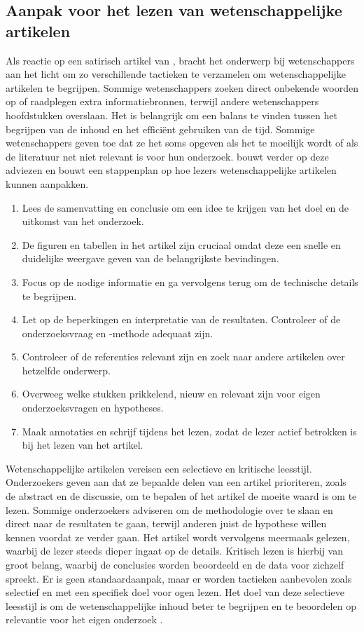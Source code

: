 \subsection{Aanpak voor het lezen van wetenschappelijke artikelen}
Als reactie op een satirisch artikel van \textcite{Ruben2016}, bracht \textcite{Pain2016} het onderwerp bij wetenschappers aan het licht om zo verschillende tactieken te verzamelen om wetenschappelijke artikelen te begrijpen. Sommige wetenschappers zoeken direct onbekende woorden op of raadplegen extra informatiebronnen, terwijl andere wetenschappers hoofdstukken overslaan. Het is belangrijk om een balans te vinden tussen het begrijpen van de inhoud en het efficiënt gebruiken van de tijd. Sommige wetenschappers geven toe dat ze het soms opgeven als het te moeilijk wordt of als de literatuur net niet relevant is voor hun onderzoek. \textcite{Pain2016} bouwt verder op deze adviezen en bouwt een stappenplan op hoe lezers wetenschappelijke artikelen kunnen aanpakken.

\begin{enumerate}
	\item Lees de samenvatting en conclusie om een idee te krijgen van het doel en de uitkomst van het onderzoek.
	\item De figuren en tabellen in het artikel zijn cruciaal omdat deze een snelle en duidelijke weergave geven van de belangrijkste bevindingen.
	\item Focus op de nodige informatie en ga vervolgens terug om de technische details te begrijpen.
	\item Let op de beperkingen en interpretatie van de resultaten. Controleer of de onderzoeksvraag en -methode adequaat zijn.
	\item Controleer of de referenties relevant zijn en zoek naar andere artikelen over hetzelfde onderwerp.
	\item Overweeg welke stukken prikkelend, nieuw en relevant zijn voor eigen onderzoeksvragen en hypotheses.
	\item Maak annotaties en schrijf tijdens het lezen, zodat de lezer actief betrokken is bij het lezen van het artikel.
\end{enumerate}

Wetenschappelijke artikelen vereisen een selectieve en kritische leesstijl. Onderzoekers geven aan dat ze bepaalde delen van een artikel prioriteren, zoals de abstract en de discussie, om te bepalen of het artikel de moeite waard is om te lezen. Sommige onderzoekers adviseren om de methodologie over te slaan en direct naar de resultaten te gaan, terwijl anderen juist de hypothese willen kennen voordat ze verder gaan. Het artikel wordt vervolgens meermaals gelezen, waarbij de lezer steeds dieper ingaat op de details. Kritisch lezen is hierbij van groot belang, waarbij de conclusies worden beoordeeld en de data voor zichzelf spreekt. Er is geen standaardaanpak, maar er worden tactieken aanbevolen zoals selectief en met een specifiek doel voor ogen lezen. Het doel van deze selectieve leesstijl is om de wetenschappelijke inhoud beter te begrijpen en te beoordelen op relevantie voor het eigen onderzoek \autocite{Hubbard2017}.

